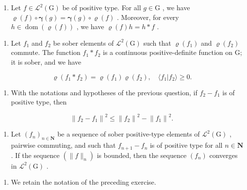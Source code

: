 \begin{enumerate}
\def\labelenumi{\alph{enumi})}
\setcounter{enumi}{3}
\tightlist
\item
  Let \(f \in \mathcal{L}^2(\mathrm{G})\) be of positive type. For all \(g \in \mathrm{G}\) , we have \(\varrho(f) \circ \boldsymbol{\gamma}(g) = \boldsymbol{\gamma}(g) \circ \varrho(f)\) . Moreover, for every \(h \in \operatorname{dom}(\varrho(f))\) , we have \(\varrho(f)h = h * f\) .
\end{enumerate}

\begin{enumerate}
\def\labelenumi{\alph{enumi})}
\setcounter{enumi}{4}
\tightlist
\item
  Let \(f_{1}\) and \(f_{2}\) be sober elements of \(\mathcal{L}^{2}(\mathrm{G})\) such that \(\varrho(f_{1})\) and \(\varrho(f_{2})\) commute. The function \(f_{1}*f_{2}\) is a continuous positive-definite function on G; it is sober, and we have
\end{enumerate}

\[
\varrho (f _ {1} * f _ {2}) = \varrho (f _ {1}) \varrho (f _ {2}), \quad \langle f _ {1} | f _ {2} \rangle \geqslant 0.
\]

\begin{enumerate}
\def\labelenumi{\alph{enumi})}
\setcounter{enumi}{5}
\tightlist
\item
  With the notations and hypotheses of the previous question, if \(f_{2} - f_{1}\) is of positive type, then
\end{enumerate}

\[
\left\| f _ {2} - f _ {1} \right\| ^ {2} \leqslant \left\| f _ {2} \right\| ^ {2} - \left\| f _ {1} \right\| ^ {2}.
\]

\begin{enumerate}
\def\labelenumi{\alph{enumi})}
\setcounter{enumi}{6}
\tightlist
\item
  Let \((f_n)_{n\in \mathbf{N}}\) be a sequence of sober positive-type elements of \(\mathcal{L}^2 (\mathrm{G})\) , pairwise commuting, and such that \(f_{n + 1} - f_n\) is of positive type for all \(n\in \mathbf{N}\) . If the sequence \((\| f\| _n)\) is bounded, then the sequence \((f_n)\) converges in \(\mathcal{L}^2 (\mathrm{G})\) .
\end{enumerate}

\begin{enumerate}
\def\labelenumi{\arabic{enumi})}
\setcounter{enumi}{21}
\tightlist
\item
  We retain the notation of the preceding exercise.
\end{enumerate}

